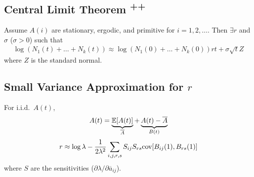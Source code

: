 \documentclass{article}
\newcommand{\cov}{\text{cov}}
\newcommand{\expec}{\mathbb{E}}
\begin{document}
        \subsection{Central Limit Theorem \textsuperscript{++}}
            Assume $A(i)$ are stationary, ergodic, and primitive for $i = 1, 2, \dots$.  Then $\exists r$ and $\sigma$ ($\sigma > 0$) such that
            \begin{align}
                \log(N_1(t) + \dots + N_k(t)) \approx \log(N_1(0) + \dots + N_k(0))rt + \sigma \sqrt{t}Z
            \end{align}
            where $Z$ is the standard normal.

        \subsection{Small Variance Approximation for $r$}
            For i.i.d.~$A(t)$,
            \begin{align}
                A(t) = \underbrace{\expec\qty[A(t)]}_{\overline{A}} + \underbrace{A(t) - \overline{A}}_{B(t)}
            \end{align}
            \begin{align}
                r \approx \log \lambda - \frac{1}{2\lambda^2}\sum_{i,j,r,s}S_{ij}S_{rs}\cov\qty[B_{ij}(1),B_{rs}(1)]
            \end{align}
            where $S$ are the sensitivities ($\partial \lambda/\partial \overline{a}_{ij}$).
\end{document}
